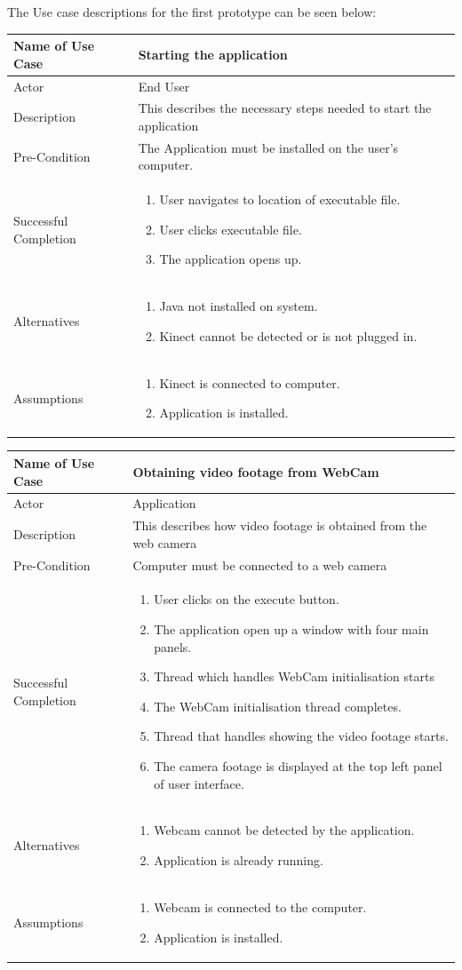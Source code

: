 \documentclass[a4paper, 12pt]{article}
\newcommand\addrow[2]{#1 &#2\\ }
\newcommand\addheading[2]{#1 &#2\\ \hline}
\newcommand\tabularhead{\begin{tabular}{lp{8cm}}
\hline
}
\newcommand\addmulrow[2]{ \begin{minipage}[t][][t]{2.5cm}#1\end{minipage}%
   &\begin{minipage}[t][][t]{8cm}
    \begin{enumerate} #2   \end{enumerate}
    \end{minipage}\\ }
\newenvironment{usecase}{\tabularhead}
{\hline\end{tabular}}
\begin{document}
The Use case descriptions for the first prototype can be seen below:

\begin{usecase}
	\addheading{Name of Use Case}{Starting the application}
	\addrow{Actor}{End User}
	\addrow{Description}{This describes the necessary steps needed to start the application}
	\addrow{Pre-Condition}{The Application must be installed on the user's computer.}
	\addmulrow{Successful Completion}{
		\item User navigates to location of executable file. 
		\item User clicks executable file. 
		\item The application opens up.}
	\addmulrow{Alternatives}{
	\item Java not installed on system. 
	\item Kinect cannot be detected or is not plugged in.}
	\addmulrow{Assumptions}{
	\item Kinect is connected to computer. 
	\item Application is installed.}
\end{usecase}

\begin{usecase}
	\addheading{Name of Use Case}{Obtaining video footage from WebCam}
	\addrow{Actor}{Application}
	\addrow{Description}{This describes how video footage is obtained from the web camera}
	\addrow{Pre-Condition}{Computer must be connected to a web camera}
	\addmulrow{Successful Completion}{
		\item User clicks on the execute button. 
		\item The application open up a window with four main panels. 
		\item Thread which handles WebCam initialisation starts
		\item The WebCam initialisation thread completes. 
		\item Thread that handles showing the video footage starts.
		\item The camera footage is displayed at the top left panel of user interface.}
	\addmulrow{Alternatives}{
	\item Webcam cannot be detected by the application.
	\item Application is already running.}
	\addmulrow{Assumptions}{
	\item Webcam is connected to the computer. 
	\item Application is installed.}
\end{usecase}
\end{document}
